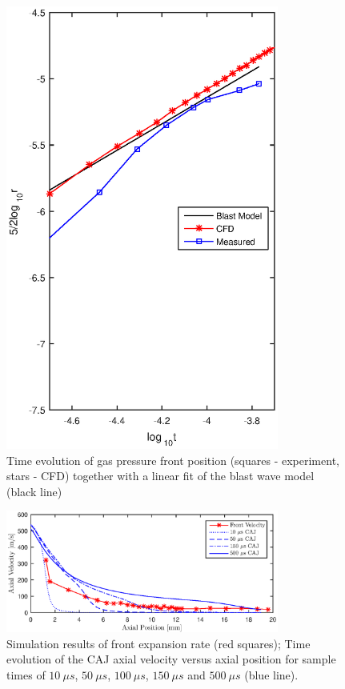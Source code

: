 \documentclass[a4paper]{iacas}%
\begin{document}
\begin{figure}
\begin{minipage}[t]{0.48\textwidth}
		\includegraphics[width=0.8\textwidth]{ModelJetPosition.eps}
		\caption{Time evolution of gas pressure front position (squares - experiment, stars - CFD) together with a linear fit of the blast wave model (black line)}
		\label{fig:model_position}
	\end{minipage}
\end{figure}
%
%
\begin{figure}
	\centering
	\includegraphics[width=0.8\textwidth]{Vel_Times.eps}
	\caption{Simulation results of front expansion rate (red squares); Time evolution of the CAJ axial velocity versus axial position for sample times of $10~\mu s$, $50~\mu s$, $100~\mu s$, $150~\mu s$ and $500~\mu s$  (blue line).}
	\label{fig:model_caj_velocity}
\end{figure}
\end{document}
